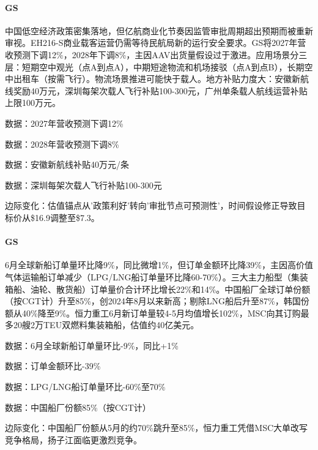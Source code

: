 \documentclass[11pt]{ctexart}
\begin{document}
\paragraph{GS} 中国低空经济政策密集落地，但亿航商业化节奏因监管审批周期超出预期而被重新审视。EH216-S商业载客运营仍需等待民航局新的运行安全要求。GS将2027年营收预测下调12\%，2028年下调8\%，主因AAV出货量假设过于激进。应用场景分三层：短期空中观光（点A到点A），中期短途物流和机场接驳（点A到点B），长期空中出租车（按需飞行）。物流场景推进可能快于载人。地方补贴力度大：安徽新航线奖励40万元，深圳每架次载人飞行补贴100-300元，广州单条载人航线运营补贴上限100万元。
{\small\color{refgray}数据：2027年营收预测下调12\%\par}
{\small\color{refgray}数据：2028年营收预测下调8\%\par}
{\small\color{refgray}数据：安徽新航线补贴40万元/条\par}
{\small\color{refgray}数据：深圳每架次载人飞行补贴100-300元\par}
{\small\color{refgray}边际变化：估值锚点从'政策利好'转向'审批节点可预测性'，时间假设修正导致目标价从\$16.9调整至\$7.3。\par}
\paragraph{GS} 6月全球新船订单量环比降9\%，同比微增1\%，但订单金额环比降39\%，主因高价值气体运输船订单减少（LPG/LNG船订单量环比降60-70\%）。三大主力船型（集装箱船、油轮、散货船）订单量价合计环比增长22\%和14\%。中国船厂全球订单份额（按CGT计）升至85\%，创2024年8月以来新高；剔除LNG船后升至87\%，韩国份额从40\%降至9\%。恒力重工6月新订单量较4-5月均值增长102\%，MSC向其订购最多20艘2万TEU双燃料集装箱船，估值约40亿美元。
{\small\color{refgray}数据：6月全球新船订单量环比-9\%，同比+1\%\par}
{\small\color{refgray}数据：订单金额环比-39\%\par}
{\small\color{refgray}数据：LPG/LNG船订单量环比-60\%至70\%\par}
{\small\color{refgray}数据：中国船厂份额85\%（按CGT计）\par}
{\small\color{refgray}边际变化：中国船厂份额从5月的约70\%跳升至85\%，恒力重工凭借MSC大单改写竞争格局，扬子江面临更激烈竞争。\par}
\end{document}
